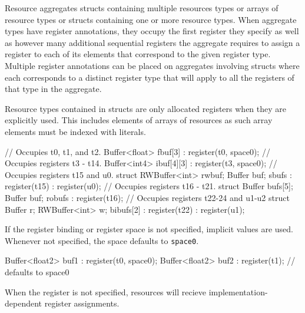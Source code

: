 Resource aggregates structs containing multiple resources types or arrays of resource types or structs containing one or more resource types.
When aggregate types have register annotations, they occupy the first register they specify as well as however many additional sequential registers
the aggregate requires to assign a register to each of its elements that correspond to the given register type.
Multiple register annotations can be placed on aggregates involving structs where each corresponds to a distinct
register type that will apply to all the registers of that type in the aggregate.

\begin{note}
Resource types contained in structs are only allocated registers when they are explicitly used.
This includes elements of arrays of resources as such array elements must be indexed with literals.
\end{note}

\begin{HLSL}
  // Occupies t0, t1, and t2.
  Buffer<float> fbuf[3] : register(t0, space0);
  // Occupies registers t3 - t14.
  Buffer<int4> ibuf[4][3] : register(t3, space0);
  // Occupies registers t15 and u0.
  struct {RWBuffer<int> rwbuf; Buffer buf;} sbufs : register(t15) : register(u0);
  // Occupies registers t16 - t21.
  struct {Buffer bufs[5]; Buffer buf;} robufs : register(t16);
  // Occupies registers t22-24 and u1-u2
  struct {Buffer r; RWBuffer<int> w;} bibufs[2] : register(t22) : register(u1);
\end{HLSL}

If the register binding or register space is not specified, implicit values are used.
Whenever not specified, the space defaults to \texttt{space0}.

\begin{HLSL}
  Buffer<float2> buf1 : register(t0, space0);
  Buffer<float2> buf2 : register(t1); // defaults to space0
\end{HLSL}

When the register is not specified, resources will recieve implementation-dependent register assignments.

